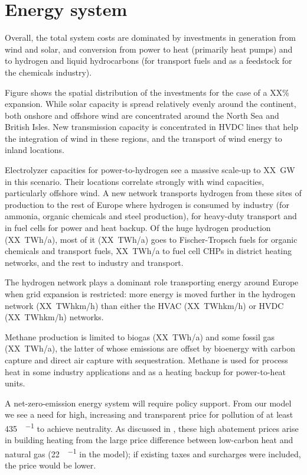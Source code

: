 \section*{Energy system}
\label{sec:es}

Overall, the total system costs are dominated by investments in generation from wind
and solar, and conversion from power to heat (primarily heat pumps)
and to hydrogen and liquid hydrocarbons (for transport fuels and as a
feedstock for the chemicals industry).

Figure shows the spatial distribution of the investments
for the case of a XX\% expansion. While solar capacity is spread
relatively evenly around the continent, both onshore and offshore wind
are concentrated around the North Sea and British Isles. New
transmission capacity is concentrated in HVDC lines that help the
integration of wind in these regions, and the transport of wind energy
to inland locations.

Electrolyzer capacities for power-to-hydrogen see a massive scale-up to XX~GW in
this scenario. Their locations correlate strongly with wind capacities,
particularly offshore wind. A new network transports hydrogen from these sites
of production to the rest of Europe where hydrogen is consumed by industry (for
ammonia, organic chemicals and steel production), for heavy-duty transport and
in fuel cells for power and heat backup. Of the huge hydrogen production
(XX~TWh/a), most of it (XX~TWh/a) goes to Fischer-Tropsch fuels for organic
chemicals and transport fuels, XX~TWh/a to fuel cell CHPs in district heating
networks, and the rest to industry and transport.

The hydrogen network plays a
dominant role transporting energy around Europe when grid expansion is
restricted: more energy is moved further in the hydrogen network (XX~TWhkm/h)
than either the HVAC (XX~TWhkm/h) or HVDC (XX~TWhkm/h) networks.

Methane production is limited to biogas (XX~TWh/a) and some fossil
gas (XX~TWh/a), the latter of whose emissions are offset by bioenergy
with carbon capture and direct air capture with sequestration.
Methane is used for process heat in some industry applications and as
a heating backup for power-to-heat units.

A net-zero-emission energy system will require policy support. From our model we
see a need for high, increasing and transparent price for \co pollution of
at least \SI{435}{\sieuro\per\tco} to achieve \co neutrality. As discussed in
\cite{brownSynergiesSector2018}, these high abatement prices arise in building
heating from the large price difference between low-carbon heat and natural gas
(\SI{22}{\sieuro\per\mwh} in the model); if existing taxes and surcharges were
included, the \co price would be lower.

